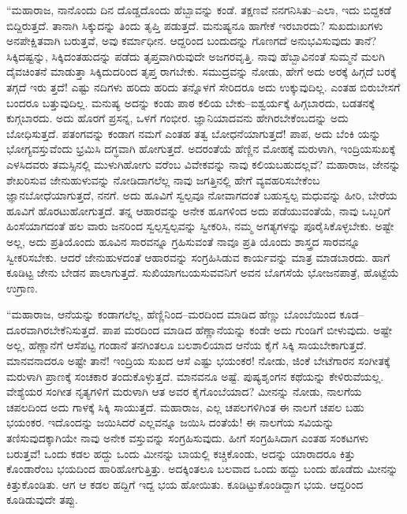 “ಮಹಾರಾಜ, ನಾನೊಂದು ದಿನ ದೊಡ್ಡದೊಂದು ಹೆಬ್ಬಾವನ್ನು ಕಂಡೆ. ತಕ್ಷಣವೆ ನನಗನಿಸಿತು–ಎಲಾ, ಇದು ಬಿದ್ದಕಡೆ ಬಿದ್ದಿರುತ್ತದೆ. ತಾನಾಗಿ ಸಿಕ್ಕುದನ್ನು ತಿಂದು ತೃಪ್ತಿ ಪಡುತ್ತದೆ. ಮನುಷ್ಯನೂ ಹಾಗೇಕೆ ಇರಬಾರದು? ಸುಖದುಃಖಗಳು ಅನಪೇಕ್ಷಿತವಾಗಿ ಬರುತ್ತವೆ, ಅವು ಕರ್ಮಾಧೀನ. ಆದ್ದರಿಂದ ಬಂದುದನ್ನು ಗೊಣಗದೆ ಅನುಭವಿಸುವುದು ತಾನೆ? ಸಿಕ್ಕಿದಷ್ಟನ್ನು, ಸಿಕ್ಕಿದಂತಹುದನ್ನು ಪಡೆದು ತೃಪ್ತವಾಗಿರುವುದೇ ಅಜಗರವೃತ್ತಿ. ನಾವು ಹೆಬ್ಬಾವಿನಂತೆ ಸುಮ್ಮನೆ ಮಲಗಿ ದೈವಚಿಂತನೆ ಮಾಡುತ್ತಾ ಸಿಕ್ಕಿದುದರಿಂದ ತೃಪ್ತ ರಾಗಬೇಕು. ಸಮುದ್ರವನ್ನು ನೋಡು, ಹೇಗೆ ಅದು ಅರಕ್ಕೆ ಹಿಗ್ಗದೆ ಬರಕ್ಕೆ ತಗ್ಗದೆ ಇರು ತ್ತದೆ! ಎಷ್ಟು ನದಿಗಳು ಹರಿದು ಹರಿದು ತನ್ನೊಳಗೆ ಸೇರಿದರೂ ಅದು ಉಕ್ಕುವುದಿಲ್ಲ. ಎಂತಹ ಬಿರುಬೇಸಗೆ ಬಂದರೂ ಬತ್ತುವುದಿಲ್ಲ. ಮನುಷ್ಯ ಅದನ್ನು ಕಂಡು ಪಾಠ ಕಲಿಯ ಬೇಕು–ಐಶ್ವರ್ಯಕ್ಕೆ ಹಿಗ್ಗಬಾರದು, ಬಡತನಕ್ಕೆ ಕುಗ್ಗಬಾರದು. ಅದು ಹೊರಗೆ ಪ್ರಸನ್ನ, ಒಳಗೆ ಗಂಭೀರ. ಜ್ಞಾನಿಯಾದವನು ಹೇಗಿರಬೇಕೆಂಬದನ್ನು ಅದು ಬೋಧಿಸುತ್ತದೆ. ಪತಂಗವನ್ನು ಕಂಡಾಗ ನಮಗೆ ಎಂತಹ ತತ್ವ ಬೋಧನೆಯಾಗುತ್ತದೆ! ಪಾಪ, ಅದು ಬೆಂಕಿ ಯನ್ನು ಭೋಗ್ಯವಸ್ತುವೆಂದು ಭ್ರಮಿಸಿ ದಗ್ಧವಾಗಿ ಹೋಗುತ್ತದೆ. ಅದರಂತೆಯೆ ಹೆಣ್ಣಿನ ಮೋಹಕ್ಕೆ ಮರುಳಾಗಿ, ಇಂದ್ರಿಯಸುಖಕ್ಕೆ ಎಳಸಿದವರು ತಮಸ್ಸಿನಲ್ಲಿ ಮುಳುಗಿಹೋಗು ವರೆಂಬ ವಿವೇಕವನ್ನು ನಾವು ಕಲಿಯಬಹುದಲ್ಲವೆ? ಮಹಾರಾಜ, ಜೇನನ್ನು ಶೇಖರಿಸುವ ಜೇನುಹುಳುವನ್ನು ನೋಡಿದಾಗಲೆಲ್ಲ ನಾವು ಜಗತ್ತಿನಲ್ಲಿ ಹೇಗೆ ವ್ಯವಹರಿಸಬೇಕೆಂಬ ಜ್ಞಾನಬೋಧೆಯಾಗುತ್ತದೆ, ನನಗೆ. ಅದು ಹೂವಿಗೆ ಸ್ವಲ್ಪವೂ ನೋವಾಗದಂತೆ ಬಹುಸ್ವಲ್ಪ ಮಧುವನ್ನು ಹೀರಿ, ಬೇರೆಯ ಹೂವಿಗೆ ಹೊರಟುಹೋಗುತ್ತದೆ. ತನ್ನ ಆಹಾರವನ್ನು ಅನೇಕ ಹೂಗಳಿಂದ ಅದು ಪಡೆಯುವಂತೆಯೆ, ನಾವು ಒಬ್ಬರಿಗೆ ಹಿಂಸೆಯಾಗದಂತೆ ಹಲ ವಾರು ಜನರಿಂದ ಸ್ವಲ್ಪಸ್ವಲ್ಪವನ್ನು ಸ್ವೀಕರಿಸಿ, ನಮ್ಮ ಅಗತ್ಯಗಳನ್ನು ಪೂರೈಸಿಕೊಳ್ಳಬೇಕು. ಅಷ್ಟೇ ಅಲ್ಲ, ಅದು ಪ್ರತಿಯೊಂದು ಹೂವಿನ ಸಾರವನ್ನೂ ಗ್ರಹಿಸುವಂತೆ ನಾವೂ ಪ್ರತಿ ಯೊಂದು ಶಾಸ್ತ್ರದ ಸಾರವನ್ನೂ ಸ್ವೀಕರಿಸಬೇಕು. ಆದರೆ ಜೇನುಹುಳದಂತೆ ಆಹಾರವನ್ನು ಸಂಗ್ರಹಿಸಿಡುವ ಕಾರ್ಯವನ್ನು ಮಾತ್ರ ಮಾಡಬಾರದು. ಹಾಗೆ ಕೂಡಿಟ್ಟ ಜೇನು ಬೇಡನ ಪಾಲಾಗುತ್ತದೆ. ಸುಖಿಯಾಗಬಯಸುವವನಿಗೆ ಅವನ ಬೊಗಸೆಯೆ ಭೋಜನಪಾತ್ರೆ, ಹೊಟ್ಟೆಯೆ ಉಗ್ರಾಣ.

“ಮಹಾರಾಜ, ಆನೆಯನ್ನು ಕಂಡಾಗಲೆಲ್ಲ, ಹೆಣ್ಣಿನಿಂದ–ಮರದಿಂದ ಮಾಡಿದ ಹೆಣ್ಣು ಬೊಂಬೆಯಿಂದ ಕೂಡ–ದೂರವಾಗಿರಬೇಕೆನಿಸುತ್ತದೆ. ಪಾಪ ಮರದಿಂದ ಮಾಡಿದ ಹೆಣ್ಣಾನೆಯನ್ನು ಕಂಡೇ ಅದು ಗುಂಡಿಗೆ ಬೀಳುವುದು. ಅಷ್ಟೇ ಅಲ್ಲ, ಹೆಣ್ಣಾನೆಗೆ ಆಸೆಪಟ್ಟ ಗಂಡಾನೆ ತನಗಿಂತಲೂ ಬಲಶಾಲಿಯಾದ ಆನೆಯ ಕೈಗೆ ಸಿಕ್ಕಿ ಸಾಯಬೇಕಾಗುತ್ತದೆ. ಮಾನವನಾದರೂ ಅಷ್ಟೇ ತಾನೆ! ಇಂದ್ರಿಯ ಸುಖದ ಆಸೆ ಎಷ್ಟು ಭಯಂಕರ! ನೋಡು, ಜಿಂಕೆ ಬೇಟೆಗಾರನ ಸಂಗೀತಕ್ಕೆ ಮರುಳಾಗಿ ಪ್ರಾಣಕ್ಕೆ ಸಂಚಕಾರ ತಂದುಕೊಳ್ಳುತ್ತದೆ. ಮಾನವನೂ ಅಷ್ಟೆ. ಪುಷ್ಯಶೃಂಗನ ಕಥೆಯನ್ನು ಕೇಳಿರುವೆಯಲ್ಲ. ವೇಶ್ಯೆಯರ ಸಂಗೀತ ನೃತ್ಯಗಳಿಗೆ ಮರುಳಾಗಿ ಆತ ಅವರ ಕೈಗೊಂಬೆಯಾದ? ಮೀನನ್ನು ನೋಡು, ನಾಲಗೆಯ ಚಪಲದಿಂದ ಅದು ಗಾಳಕ್ಕೆ ಸಿಕ್ಕಿ ಸಾಯುತ್ತದೆ. ಮಹಾರಾಜ, ಎಲ್ಲ ಚಪಲಗಳಿಗಿಂತ ಈ ನಾಲಗೆ ಚಪಲ ಬಹು ಭಯಂಕರ. ಇದೊಂದನ್ನು ಜಯಿಸಿದರೆ ಎಲ್ಲವನ್ನೂ ಜಯಿಸಿ ದಂತೆಯೆ! ಈ ನಾಲಗೆಯ ಸವಿಯನ್ನು ತಣಿಸುವುದಕ್ಕಾಗಿಯೇ ನಾವು ಅನೇಕ ವಸ್ತುವನ್ನು ಸಂಗ್ರಹಿಸುವುದು. ಹೀಗೆ ಸಂಗ್ರಹಿಸಿದಾಗ ಎಂತಹ ಸಂಕಟಗಳು ಬರುತ್ತವೆ! ಒಂದು ಕಡಲ ಹದ್ದು ಒಂದು ಮೀನನ್ನು ಬಾಯಲ್ಲಿ ಕಚ್ಚಿಕೊಂಡು, ಅದನ್ನು ಯಾರಾದರೂ ಕಿತ್ತು ಕೊಂಡಾರೆಂಬ ಭಯದಿಂದ ಹಾರಿಹೋಗುತ್ತಿತ್ತು. ಅದಕ್ಕಿಂತಲೂ ಬಲವಾದ ಒಂದು ಹದ್ದು ಬಂದು ಹೊಡೆದು ಮೀನನ್ನು ಕಿತ್ತುಕೊಂಡಿತು. ಆಗ ಆ ಕಡಲ ಹದ್ದಿಗೆ ಇದ್ದ ಭಯ ಹೋಯಿತು. ಕೂಡಿಟ್ಟುಕೊಂಡಿದ್ದಾಗ ಭಯ. ಆದ್ದರಿಂದ ಕೂಡಿಡುವುದೇ ತಪ್ಪು.

